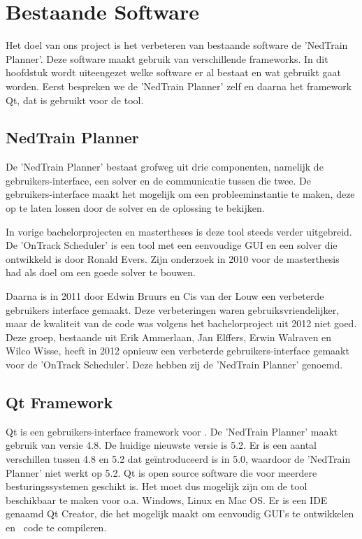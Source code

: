 \section{Bestaande Software}
Het doel van ons project is het verbeteren van bestaande software de 'NedTrain Planner'. Deze software maakt gebruik van verschillende frameworks. In dit hoofdstuk wordt uiteengezet welke software er al bestaat en wat gebruikt gaat worden. Eerst bespreken we de 'NedTrain Planner' zelf en daarna het framework Qt, dat is gebruikt voor de tool.

\subsection{NedTrain Planner}
De 'NedTrain Planner' bestaat grofweg uit drie componenten, namelijk de gebruikers-interface, een solver en de communicatie tussen die twee. De gebruikers-interface maakt het mogelijk om een probleeminstantie te maken, deze op te laten lossen door de solver en de oplossing te bekijken.

In vorige bachelorprojecten en mastertheses is deze tool steeds verder uitgebreid. De 'OnTrack Scheduler' is een tool met een eenvoudige GUI en een solver die ontwikkeld is door Ronald Evers. Zijn onderzoek in 2010 voor de masterthesis had als doel om een goede solver te bouwen. \cite{ronaldevers2010}

Daarna is in 2011 door Edwin Bruurs en Cis van der Louw een verbeterde gebruikers interface gemaakt.\cite{bep2011nedtrain} Deze verbeteringen waren gebruiksvriendelijker, maar de kwaliteit van de code was volgens het bachelorproject uit 2012 niet goed.\cite{bep2012nedtrain} Deze groep, bestaande uit Erik Ammerlaan, Jan Elffers, Erwin Walraven en Wilco Wisse, heeft in 2012 opnieuw een verbeterde gebruikers-interface gemaakt voor de 'OnTrack Scheduler'. Deze hebben zij de 'NedTrain Planner' genoemd.

\subsection{Qt Framework}
Qt is een gebruikers-interface framework voor \cpp . De 'NedTrain Planner' maakt gebruik van versie 4.8. De huidige nieuwste versie is 5.2. Er is een aantal verschillen tussen 4.8 en 5.2 dat ge\"introduceerd is in 5.0, waardoor de 'NedTrain Planner' niet werkt op 5.2. Qt is open source software die voor meerdere besturingssystemen geschikt is. Het moet dus mogelijk zijn om de tool beschikbaar te maken voor o.a. Windows, Linux en Mac OS. Er is een IDE genaamd Qt Creator, die het mogelijk maakt om eenvoudig GUI's te ontwikkelen en \cpp\ code te compileren. \cite{seminarium2014}

